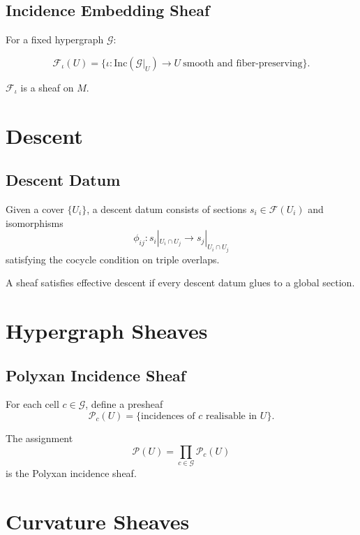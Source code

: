 \subsection{Incidence Embedding Sheaf}

For a fixed hypergraph $\mathcal{G}$:

\[
\mathcal{F}_{\iota}(U) =
\{ \iota : \mathrm{Inc}(\mathcal{G}|_U)\to U \ \text{smooth and fiber-preserving} \}.
\]

\begin{proposition}
$\mathcal{F}_\iota$ is a sheaf on $M$.
\end{proposition}

\section{Descent}

\subsection{Descent Datum}

Given a cover $\{U_i\}$, a descent datum consists of sections $s_i \in \mathcal{F}(U_i)$ and isomorphisms
\[
\phi_{ij} : s_i|_{U_i\cap U_j} \to s_j|_{U_i\cap U_j}
\]
satisfying the cocycle condition on triple overlaps.

\begin{definition}
A sheaf satisfies effective descent if every descent datum glues to a global section.
\end{definition}

\section{Hypergraph Sheaves}

\subsection{Polyxan Incidence Sheaf}

For each cell $c \in \mathcal{G}$, define a presheaf
\[
\mathcal{P}_c(U)
  = \{ \text{incidences of $c$ realisable in $U$} \}.
\]

The assignment
\[
\mathcal{P}(U)=\prod_{c\in \mathcal{G}} \mathcal{P}_c(U)
\]
is the Polyxan incidence sheaf.

\section{Curvature Sheaves}

